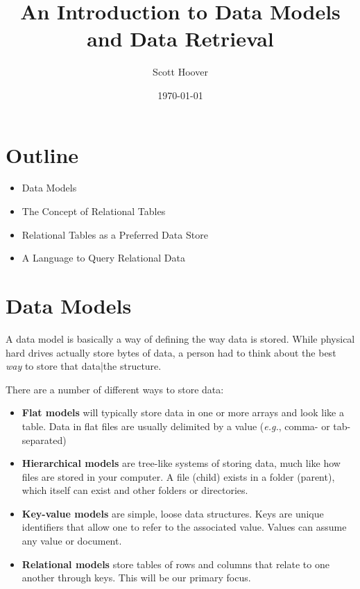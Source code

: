 \documentclass[mathserif, xcolor=table, pdfpages, default, graphics, listings]{beamer}
\title{An Introduction to Data Models and Data Retrieval}
\author{Scott Hoover}
\date{\today}
\begin{document}
    \frame{\titlepage} 

    \section{Outline}

        \begin{frame}
        \begin{itemize}
            \item Data Models
            \pause \item The Concept of Relational Tables
            \pause\item Relational Tables as a Preferred Data Store
            \pause\item A Language to Query Relational Data
        \end{itemize}
        \end{frame}

    \section{Data Models}
        

        \begin{frame}
            A data model is basically a way of defining the way data is stored. While physical hard drives actually store bytes of data, a person had to think about the best \emph{way} to store that data|the structure.
        \end{frame}   


        \begin{frame}
            There are a number of different ways to store data:
                \begin{itemize}
                    \pause \item \textbf{Flat models} will typically store data in one or more arrays and look like a table. Data in flat files are usually delimited by a value (\emph{e.g.}, comma- or tab-separated) 
                    \pause\item \textbf{Hierarchical models} are tree-like systems of storing data, much like how files are stored in your computer. A file (child) exists in a folder (parent), which itself can exist and other folders or directories.
                    \pause\item \textbf{Key-value models} are simple, loose data structures. Keys are unique identifiers that allow one to refer to the associated value. Values can assume any value or document. 
                    \pause\item \textbf{Relational models} store tables of rows and columns that relate to one another through keys. This will be our primary focus.
                \end{itemize}
        \end{frame} 
\end{document}

